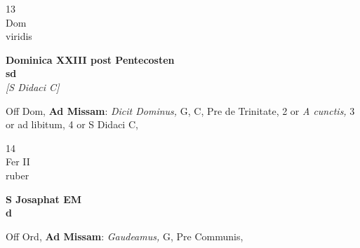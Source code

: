 \documentclass[10pt, openany]{book}
\begin{document}
        \begin{center}
            \begin{minipage}{3.5in}
                \vspace{2em}
                \begin{minipage}{0.5in}
                    {\Huge 13} \\
                    {\normalsize Dom} \\
                    {\normalsize viridis}
                \end{minipage}
                \begin{minipage}{3.0in}
                    \textbf{ \large Dominica XXIII post Pentecosten \\
                    \textnormal{\normalsize sd}} \\ \textit{[S Didaci C]} \\ 
                \end{minipage}
                \begin{justify}Off Dom, \textbf{Ad Missam}: \textit{Dicit Dominus,} G, C, Pre de Trinitate, 2 or \textit{A cunctis,} 3 or ad libitum, 4 or S Didaci C,  
                \end{justify}
            \end{minipage}
        \end{center}
    
        \begin{center}
            \begin{minipage}{3.5in}
                \vspace{2em}
                \begin{minipage}{0.5in}
                    {\Huge 14} \\
                    {\normalsize Fer II} \\
                    {\normalsize ruber}
                \end{minipage}
                \begin{minipage}{3.0in}
                    \textbf{ \large S Josaphat EM \\
                    \textnormal{\normalsize d}} \\ 
                \end{minipage}
                \begin{justify}Off Ord, \textbf{Ad Missam}: \textit{Gaudeamus,} G, Pre Communis,  
                \end{justify}
            \end{minipage}
        \end{center}
    
\end{document}
